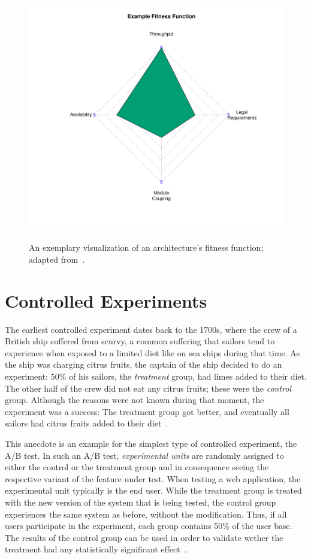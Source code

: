 \begin{figure}[h]
        \caption{An exemplary visualization of an architecture's fitness function; adapted from~\cite{WEB:EvolArch:2016}.}
        \includegraphics[width=\textwidth]{gfx/fitness-function-example}
        \label{figure:fundamentals:evolutionary:fitness}
\end{figure}

\section{Controlled Experiments}
\label{sec:fundamentals:experiments}

The earliest controlled experiment dates back to the 1700s, where the crew of a British ship suffered from scurvy, a common suffering that sailors tend to experience when exposed to a limited diet like on sea ships during that time.
As the ship was charging citrus fruits, the captain of the ship decided to do an experiment: 50\% of his sailors, the \emph{treatment} group, had limes added to their diet.
The other half of the crew did not eat any citrus fruits; these were the \emph{control} group.
Although the reasons were not known during that moment, the experiment was a success: The treatment group got better, and eventually all sailors had citrus fruits added to their diet~\cite{rossi2003evaluation,marks2000progress}.

This anecdote is an example for the simplest type of controlled experiment, the A/B test.
In such an A/B test, \emph{experimental units} are randomly assigned to either the control or the treatment group and in consequence seeing the respective variant of the feature under test.
When testing a web application, the experimental unit typically is the end user.
While the treatment group is treated with the new version of the system that is being tested, the control group experiences the same system as before, without the modification.
Thus, if all users participate in the experiment, each group contains 50\% of the user base.
The results of the control group can be used in order to validate wether the treatment had any statistically significant effect~\cite{Kohavi2009}.


